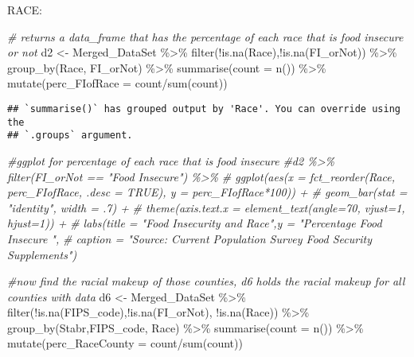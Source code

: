 \documentclass[
]{article}
\newenvironment{Shaded}{\begin{snugshade}}{\end{snugshade}}
\newcommand{\AttributeTok}[1]{\textcolor[rgb]{0.77,0.63,0.00}{#1}}
\newcommand{\CommentTok}[1]{\textcolor[rgb]{0.56,0.35,0.01}{\textit{#1}}}
\newcommand{\FunctionTok}[1]{\textcolor[rgb]{0.00,0.00,0.00}{#1}}
\newcommand{\NormalTok}[1]{#1}
\newcommand{\OtherTok}[1]{\textcolor[rgb]{0.56,0.35,0.01}{#1}}
\newcommand{\SpecialCharTok}[1]{\textcolor[rgb]{0.00,0.00,0.00}{#1}}
\begin{document}
RACE:

\begin{Shaded}
\begin{Highlighting}[]
\CommentTok{\# returns a data\_frame that has the percentage of each race that is food insecure or not}
\NormalTok{d2 }\OtherTok{\textless{}{-}}\NormalTok{ Merged\_DataSet }\SpecialCharTok{\%\textgreater{}\%} \FunctionTok{filter}\NormalTok{(}\SpecialCharTok{!}\FunctionTok{is.na}\NormalTok{(Race),}\SpecialCharTok{!}\FunctionTok{is.na}\NormalTok{(FI\_orNot)) }\SpecialCharTok{\%\textgreater{}\%} 
  \FunctionTok{group\_by}\NormalTok{(Race, FI\_orNot) }\SpecialCharTok{\%\textgreater{}\%} 
  \FunctionTok{summarise}\NormalTok{(}\AttributeTok{count =} \FunctionTok{n}\NormalTok{()) }\SpecialCharTok{\%\textgreater{}\%} 
  \FunctionTok{mutate}\NormalTok{(}\AttributeTok{perc\_FIofRace =}\NormalTok{ count}\SpecialCharTok{/}\FunctionTok{sum}\NormalTok{(count))}
\end{Highlighting}
\end{Shaded}

\begin{verbatim}
## `summarise()` has grouped output by 'Race'. You can override using the
## `.groups` argument.
\end{verbatim}

\begin{Shaded}
\begin{Highlighting}[]
\CommentTok{\#ggplot for percentage of each race that is food insecure}
\CommentTok{\#d2 \%\textgreater{}\% filter(FI\_orNot == "Food Insecure") \%\textgreater{}\% }
\CommentTok{\#  ggplot(aes(x = fct\_reorder(Race, perc\_FIofRace, .desc = TRUE), y = perc\_FIofRace*100)) +}
\CommentTok{\#  geom\_bar(stat = "identity", width = .7) +}
\CommentTok{\#  theme(axis.text.x = element\_text(angle=70, vjust=1, hjust=1)) +}
\CommentTok{\#  labs(title = "Food Insecurity and Race",y = "Percentage Food Insecure ", }
 \CommentTok{\#      caption = "Source: Current Population Survey Food Security Supplements") }
  

\CommentTok{\#now find the racial makeup of those counties, d6 holds the racial makeup for all counties with data}
\NormalTok{d6 }\OtherTok{\textless{}{-}}\NormalTok{ Merged\_DataSet }\SpecialCharTok{\%\textgreater{}\%} \FunctionTok{filter}\NormalTok{(}\SpecialCharTok{!}\FunctionTok{is.na}\NormalTok{(FIPS\_code),}\SpecialCharTok{!}\FunctionTok{is.na}\NormalTok{(FI\_orNot), }\SpecialCharTok{!}\FunctionTok{is.na}\NormalTok{(Race)) }\SpecialCharTok{\%\textgreater{}\%} 
  \FunctionTok{group\_by}\NormalTok{(Stabr,FIPS\_code, Race) }\SpecialCharTok{\%\textgreater{}\%} 
  \FunctionTok{summarise}\NormalTok{(}\AttributeTok{count =} \FunctionTok{n}\NormalTok{()) }\SpecialCharTok{\%\textgreater{}\%} 
  \FunctionTok{mutate}\NormalTok{(}\AttributeTok{perc\_RaceCounty =}\NormalTok{ count}\SpecialCharTok{/}\FunctionTok{sum}\NormalTok{(count))}
\end{Highlighting}
\end{Shaded}
\end{document}
